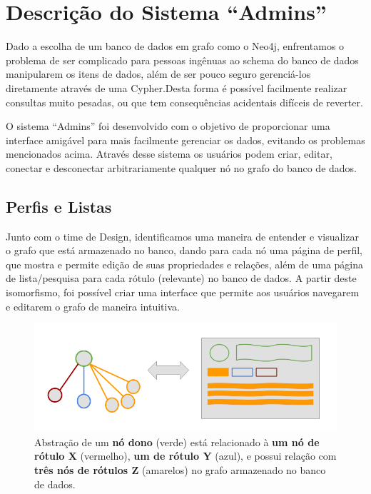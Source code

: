 \chapter{Descrição do Sistema ``Admins''}
\label{chap4}

Dado a escolha de um banco de dados em grafo como o Neo4j, enfrentamos o problema de ser complicado para pessoas ingênuas ao schema do banco de dados manipularem os itens de dados, além de ser pouco seguro gerenciá-los diretamente através de uma Cypher.Desta forma é possível facilmente realizar consultas muito pesadas, ou que tem consequências acidentais difíceis de reverter.

O sistema ``Admins'' foi desenvolvido com o objetivo de proporcionar uma interface amigável para mais facilmente gerenciar os dados, evitando os problemas mencionados acima. Através desse sistema os usuários podem criar, editar, conectar e desconectar arbitrariamente qualquer nó no grafo do banco de dados.

\section{Perfis e Listas}

Junto com o time de Design, identificamos uma maneira de entender e visualizar o grafo que está armazenado no banco, dando para cada nó uma página de perfil, que mostra e permite edição de suas propriedades e relações, além de uma página de lista/pesquisa para cada rótulo (relevante) no banco de dados. A partir deste isomorfismo, foi possível criar uma interface que permite aos usuários navegarem e editarem o grafo de maneira intuitiva.

\begin{figure}[H]
    \centering
    \includegraphics[width=1.0\linewidth]{Imagens/chap04/perfil-isomorfismo.png}
    \caption{Abstração de um \textbf{nó dono} (verde) está relacionado à \textbf{um nó de rótulo X} (vermelho), \textbf{um de rótulo Y} (azul), e possui relação com \textbf{três nós de rótulos Z} (amarelos) no grafo armazenado no banco de dados.}
    \label{fig:isomorphism}
\end{figure}


